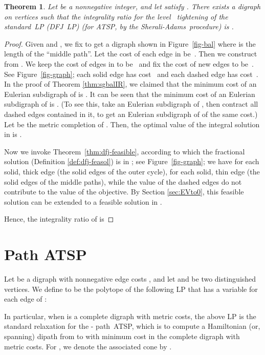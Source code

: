 \documentclass[11pt]{article}
\newtheorem{theorem}{Theorem}[section]
\newcommand{\sa}{\textsf{Sherali-Adams}}
\begin{document}
\begin{theorem}\label{thm:dfj-sgIR}
Let  be a nonnegative integer, and let 
satisfy .
There exists a digraph on  vertices
such that the integrality ratio for
the level~ tightening of the standard~LP (DFJ~LP)
(for ATSP, by the \sa\ procedure)
is .
\end{theorem}

\begin{proof}
Given  and , we
fix  to get a digraph  shown in
Figure~\ref{fig-bal} where  is the length of the ``middle path''.
Let the cost of each  edge in  be~.
Then we construct  from .
We keep the cost of edges in  to be~ and fix
the cost of new edges to be~.
See Figure~\ref{fig-graph}; each solid edge has cost~ and
each dashed edge has cost~.
In the proof of Theorem \ref{thm:sgbalIR}, we claimed that
the minimum cost of an Eulerian subdigraph of  is .
It can be seen that the minimum cost of an Eulerian subdigraph of
 is .
(To see this, take an Eulerian subdigraph of ,
then contract all dashed edges contained in it,
to get an Eulerian subdigraph of  of the same cost.)
Let  be the metric completion of .
Then, the optimal value of the integral solution in
 is .

Now we invoke Theorem~\ref{thm:dfj-feasible}, according to which
the fractional solution 
(Definition \ref{def:dfj-feasol}) is in ;
see Figure~\ref{fig-graph};
we have
 for each solid, thick edge 
(the solid edges of the outer cycle),
 for each solid, thin edge 
(the solid edges of the middle paths), 
while the value of the dashed edges do not contribute to the value of the objective.
By Section \ref{sec:EVto0}, this feasible solution can
be extended to a feasible solution in .



Hence, the integrality ratio of  is

\end{proof}






\section{Path ATSP}

Let  be a digraph with nonnegative edge costs , and let 
and  be two distinguished vertices. We define
 to be the polytope of the following LP that has a variable  for each edge  of :




In particular, when  is a complete digraph with metric costs, the
above LP is the standard relaxation
for the - path~ATSP, which is to compute a Hamiltonian (or,
spanning) dipath from  to  with minimum cost in the complete
digraph with metric costs. For  , we denote the
associated cone by .
\end{document}
